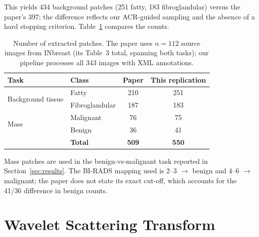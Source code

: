 This yields 434 background patches (251 fatty, 183 fibroglandular) versus the paper's 397; the difference reflects our ACR-guided sampling and the absence of a hard stopping criterion. Table~\ref{tab:patch_counts} compares the counts.

\begin{table}[h]
\centering
\caption[Number of extracted patches: paper versus this replication]{Number of extracted patches. The paper uses $n = 112$ source images from INbreast (its Table~3 total, spanning both tasks); our pipeline processes all 343 images with XML annotations.}
\label{tab:patch_counts}
\begin{tabular}{llcc}
\toprule
\textbf{Task} & \textbf{Class} & \textbf{Paper \cite{razali2023cnn}} & \textbf{This replication} \\
\midrule
\multirow{2}{*}{Background tissue} & Fatty            & 210 & 251 \\
                                   & Fibroglandular   & 187 & 183 \\
\midrule
\multirow{2}{*}{Mass}              & Malignant        & 76  & 75 \\
                                   & Benign           & 36  & 41 \\
\midrule
                                   & \textbf{Total}   & \textbf{509} & \textbf{550} \\
\bottomrule
\end{tabular}

\vspace{0.3em}
{\small Mass patches are used in the benign-vs-malignant task reported in Section~\ref{sec:results}. The BI-RADS mapping used is 2--3 $\rightarrow$ benign and 4--6 $\rightarrow$ malignant; the paper does not state its exact cut-off, which accounts for the 41/36 difference in benign counts.}
\end{table}


\section{Wavelet Scattering Transform} \label{sec:ws}

